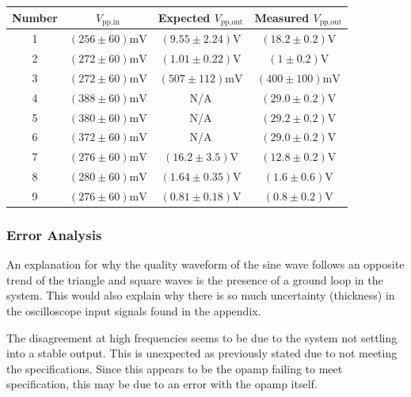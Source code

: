 \documentclass[11pt]{article}
\begin{document}
\begin{table}[H]
	\centering
	\begin{tabular}{|c|c|c|c|}
		\hline
		Number 	& $V_\text{pp,in}$ 					& Expected $V_\text{pp,out}$ 	& Measured $V_\text{pp,out}$ \\
		\hline
		1		& $(256 \pm 60) \si{\milli\volt}$	& $(9.55 \pm 2.24) \si{\volt}$	& $(18.2 \pm 0.2) \si{\volt}$ \\
		\hline
		2		& $(272 \pm 60) \si{\milli\volt}$	& $(1.01 \pm 0.22) \si{\volt}$	& $(1 \pm 0.2) \si{\volt}$ \\
		\hline
		3		& $(272 \pm 60) \si{\milli\volt}$	& $(507 \pm 112)\si{\milli\volt}$ & $(400 \pm 100) \si{\milli\volt}$ \\
		\hline
		4		& $(388 \pm 60) \si{\milli\volt}$	& N/A							& $(29.0 \pm 0.2) \si{\volt}$ \\
		\hline
		5		& $(380 \pm 60) \si{\milli\volt}$	& N/A							& $(29.2 \pm 0.2) \si{\volt}$ \\
		\hline
		6		& $(372 \pm 60) \si{\milli\volt}$	& N/A							& $(29.0 \pm 0.2) \si{\volt}$ \\
		\hline
		7		& $(276 \pm 60) \si{\milli\volt}$	& $(16.2 \pm 3.5) \si{\volt}$	& $(12.8 \pm 0.2) \si{\volt}$ \\
		\hline
		8		& $(280 \pm 60) \si{\milli\volt}$	& $(1.64 \pm 0.35) \si{\volt}$	& $(1.6 \pm 0.6) \si{\volt}$ \\
		\hline
		9		& $(276 \pm 60) \si{\milli\volt}$	& $(0.81 \pm 0.18) \si{\volt}$	& $(0.8 \pm 0.2) \si{\volt}$\\
		\hline
	\end{tabular}
	
\end{table}

\subsubsection{Error Analysis}
An explanation for why the quality waveform of the sine wave follows an 
opposite trend of the triangle and square waves is the presence of a ground 
loop in the system. This would also explain why there is so much uncertainty 
(thickness) in the oscilloscope input signals found in the appendix.

The disagreement at high frequencies seems to be due to the system not settling
into a stable output. This is unexpected as previously stated due to not 
meeting the specifications. Since this appears to be the opamp failing to meet
specification, this may be due to an error with the opamp itself.
\end{document}
